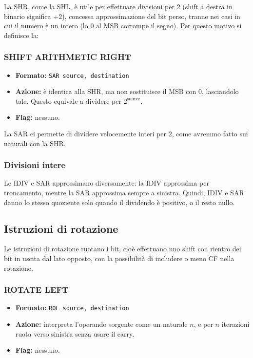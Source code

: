 \documentclass[a4paper,11pt]{article}
\begin{document}
La SHR, come la SHL, è utile per effettuare divisioni per 2 (shift a destra in binario significa $\div 2$), concessa approssimazione del bit perso, tranne nei casi in cui il numero è un intero (lo 0 al MSB corrompe il segno). 
Per questo motivo si definisce la:

\subsubsection{SHIFT ARITHMETIC RIGHT}
\begin{itemize}
	\item \textbf{Formato:} \lstinline|SAR source, destination|
	\item \textbf{Azione:} è identica alla SHR, ma non sostituisce il MSB con 0, lasciandolo tale.
		Questo equivale a dividere per $2^\text{source}$.
	\item \textbf{Flag:} nessuno.
\end{itemize}

La SAR ci permette di dividere velocemente interi per 2, come avremmo fatto sui naturali con la SHR.

\subsubsection{Divisioni intere}
Le IDIV e SAR approssimano diversamente: la IDIV approssima per troncamento, mentre la SAR approssima sempre a sinistra.
Quindi, IDIV e SAR danno lo stesso quoziente solo quando il dividendo è positivo, o il resto nullo.

\subsection{Istruzioni di rotazione}
Le istruzioni di rotazione ruotano i bit, cioè effettuano uno shift con rientro dei bit in uscita dal lato opposto, con la possibilità di includere o meno CF nella rotazione.

\subsubsection{ROTATE LEFT}
\begin{itemize}
	\item \textbf{Formato:} \lstinline|ROL source, destination|
	\item \textbf{Azione:} interpreta l'operando sorgente come un naturale $n$, e per $n$ iterazioni ruota verso sinistra senza usare il carry.
	\item \textbf{Flag:} nessuno.
\end{itemize}
\end{document}
